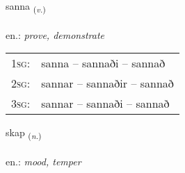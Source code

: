 \documentclass[frontgrid, backgrid]{flacards}\usepackage[]{graphicx}\usepackage[]{xcolor}
\begin{document}
\renewcommand{\flhead}{\vskip5pt \fboxsep=0pt {\small\bfseries\footnotesize Sagnorð | Verb}}
\renewcommand{\fcfoot}{\vskip5pt \fboxsep=0pt \hspace{2pt}{\small\bfseries\footnotesize 2K}}

\renewcommand{\blhead}{\vskip5pt {\small\bfseries\footnotesize Sagnorð | Verb }}
\renewcommand{\bcfoot}{\vskip5pt \hspace{2pt}{\small\bfseries\footnotesize 2K}}


{sanna \small{\textsubscript{(\textit{v.})}} \\[1ex] %
\textphonetic{[sana]} \\
en.: \emph{prove, demonstrate} \\  [2ex]
\renewcommand*{\arraystretch}{0.8}
\begin{tabular}{p{1cm}l}
\textsc{1sg}: & sanna -- sannaði -- sannað \\ 
\textsc{2sg}: & sannar -- sannaðir -- sannað \\ 
\textsc{3sg}: & sannar -- sannaði -- sannað \\ 
\end{tabular}
}

\renewcommand{\flhead}{\vskip5pt \fboxsep=0pt {\small\bfseries\footnotesize Nafnorð | Noun}}
\renewcommand{\fcfoot}{\vskip5pt \fboxsep=0pt \hspace{2pt}{\small\bfseries\footnotesize 2K}}

\renewcommand{\blhead}{\vskip5pt {\small\bfseries\footnotesize Nafnorð | Noun }}
\renewcommand{\bcfoot}{\vskip5pt \hspace{2pt}{\small\bfseries\footnotesize 2K}}


{skap \small{\textsubscript{(\textit{n.})}} \\[1ex] %
\textphonetic{[skaːp]} \\
en.: \emph{mood, temper} \\  [2ex]
\renewcommand*{\arraystretch}{0.8}
}
\end{document}
